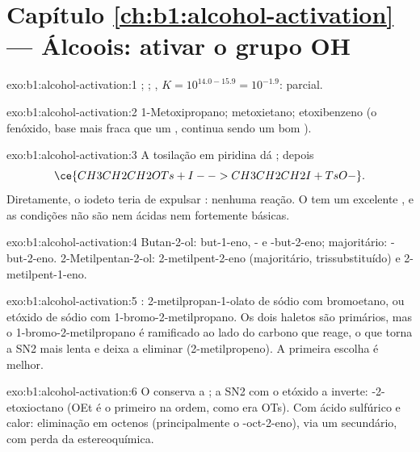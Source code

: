 \section*{Capítulo \ref{ch:b1:alcohol-activation} --- Álcoois: ativar o grupo OH}

\begin{solution}{exo:b1:alcohol-activation:1}
;
;
, $K = 10^{14.0 - 15.9} = 10^{-1.9}$:
parcial.
\end{solution}

\begin{solution}{exo:b1:alcohol-activation:2}
1-Metoxipropano; metoxietano; etoxibenzeno (o fenóxido, base mais fraca
que um , continua sendo um bom ).
\end{solution}

\begin{solution}{exo:b1:alcohol-activation:3}
A tosilação em piridina dá ; depois
\[ \ce{CH3CH2CH2OTs + I- -> CH3CH2CH2I + TsO-}. \] Diretamente, o iodeto teria de
expulsar : nenhuma reação. O  tem um excelente ,
e as condições não são nem ácidas nem fortemente básicas.
\end{solution}

\begin{solution}{exo:b1:alcohol-activation:4}
Butan-2-ol: but-1-eno, - e -but-2-eno; majoritário:
-but-2-eno. 2-Metilpentan-2-ol: 2-metilpent-2-eno (majoritário,
trissubstituído) e 2-metilpent-1-eno.
\end{solution}

\begin{solution}{exo:b1:alcohol-activation:5}
: 2-metilpropan-1-olato de sódio com bromoetano,
ou etóxido de sódio com 1-bromo-2-metilpropano. Os dois haletos são
primários, mas o 1-bromo-2-metilpropano é ramificado ao lado do carbono
que reage, o que torna a SN2 mais lenta e deixa a  eliminar
(2-metilpropeno). A primeira escolha é melhor.
\end{solution}

\begin{solution}{exo:b1:alcohol-activation:6}
O  conserva a  ; a SN2 com o etóxido a inverte:
-2-etoxioctano (OEt é o primeiro na ordem, como era OTs). Com ácido
sulfúrico e calor: eliminação em octenos (principalmente o
-oct-2-eno), via um  secundário, com perda da estereoquímica.
\end{solution}

